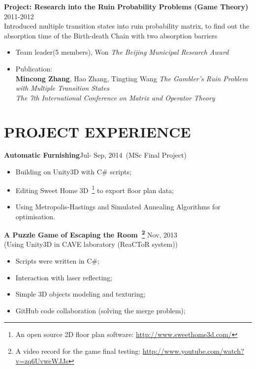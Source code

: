 \documentclass[line,margin]{res}
\begin{document}
\begin{resume}
{\bf Project: Research into the Ruin Probability Problems (Game Theory)}
\hfill{\textcolor[rgb]{0.7,0.7,0.7}{2011-2012}}\\
Introduced multiple transition states into ruin probability matrix, to find out the absorption time of the Birth-death Chain with two absorption barriers\\
\begin{itemize}\itemsep -2pt %
    \item Team leader(5 members), Won \emph{The Beijing Municipal Research Award}
    \item Publication:\\
\textbf{Mincong Zhang}, Hao Zhang, Tingting Wang   \emph{The Gambler's Ruin Problem with Multiple Transition States}\\
\emph{The 7th International Conference on Matrix and Operator Theory}
\end{itemize}


\section{PROJECT EXPERIENCE}

{\bf Automatic Furnishing}\hfill{\textcolor[rgb]{0.7,0.7,0.7}{Jul- Sep, 2014}}\
(MSc Final Project)
\begin{itemize}\itemsep -2pt %
    \item Building on Unity3D with C\# scripts;
    \item Editing Sweet Home 3D~\footnote{An open source 2D floor plan software: \url{http://www.sweethome3d.com/}} to export floor plan data;
    \item Using Metropolis-Hastings and Simulated Annealing Algorithms for optimisation.
\end{itemize}

{\bf A Puzzle Game of Escaping the Room~\footnote{A video record for the game final testing: \url{http://www.youtube.com/watch?v=zq6UvweWJJs}}}
\hfill{\textcolor[rgb]{0.7,0.7,0.7}{Nov, 2013}}\\
(Using Unity3D in CAVE laboratory (ReaCToR system))
\begin{itemize}\itemsep -2pt %
    \item Scripts were written in C\#;
    \item Interaction with laser reflecting;
    \item Simple 3D objects modeling and texturing;
    \item GitHub code collaboration (solving the merge problem);
\end{itemize}


\end{resume}
\end{document}
